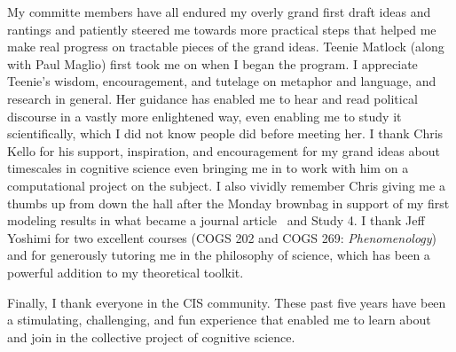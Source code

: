 \documentclass[12pt,chapterheads]{UCMerced}
\begin{document}
\begin{frontmatter}
\begin{acknowledgements}
My committe members have all
endured my overly grand first draft ideas and rantings and patiently steered me
towards more practical steps that helped me make real progress on 
tractable pieces of the grand ideas. Teenie Matlock (along with Paul Maglio) first 
took me on when I began the program. I appreciate Teenie's wisdom,
encouragement, and tutelage on metaphor and language, and research in general. 
Her guidance has enabled me to hear and read political discourse in a vastly more
enlightened way, even enabling me to study it scientifically, which I did not
know people did before meeting her. 
I thank Chris Kello for his support, inspiration, and encouragement 
for my grand ideas about timescales in cognitive science even bringing me in
to work with him on a computational project on the subject. I also 
vividly remember Chris giving me a thumbs up from down the hall after the 
Monday brownbag in support of my first modeling results in what became a 
journal article~\cite{Turner2018} and Study 4. I thank Jeff Yoshimi 
for two excellent courses 
(COGS 202 and COGS 269: \emph{Phenomenology})
and for generously tutoring me in the philosophy of science, 
which has been a powerful addition to my theoretical toolkit.

Finally, I thank everyone in the CIS community. These past five years have been a 
stimulating, challenging, and fun experience
that enabled me to learn about and join in the collective project of
cognitive science.
\end{acknowledgements}



\end{frontmatter}
\end{document}
